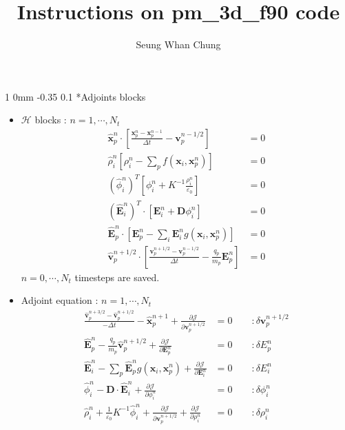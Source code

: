 \documentclass[11pt]{article}
\title{Instructions on pm\_3d\_f90 code}
\author{Seung Whan Chung}
\makeatletter
\renewcommand{\subsection}{\@startsection
{subsection}%
{1}%
{0mm}%
{-0.35\baselineskip}%
{0.1\baselineskip}%
{\normalfont\large\bfseries\color{brown}}}%
\def\Dpartial#1#2{ \frac{\partial #1}{\partial #2} }
\newcommand{\vp}{\mathbf{v}_p}
\newcommand{\xp}{\mathbf{x}_p}
\newcommand{\Dt}{\Delta t}
\newcommand{\vph}{\hat{\mathbf{v}}_p}
\newcommand{\xph}{\hat{\mathbf{x}}_p}
\newcommand{\Eh}{\hat{\mathbf{E}}}
\newcommand{\phih}{\hat{\phi}}
\newcommand{\rhoh}{\hat{\rho}}
\newcommand{\cH}{\mathcal{H}}
\newcommand{\cJ}{\mathcal{J}}
\makeatother
\begin{document}
\maketitle
\tableofcontents
\clearpage

\subsection*{Adjoints blocks}

\begin{itemize}
\item $\cH$ blocks : $n=1,\cdots,N_t$
\begin{equation*}
\begin{split}
\xph^{n}\cdot\left[ \frac{\xp^{n} - \xp^{n-1}}{\Dt} - \vp^{n-1/2} \right] &= 0\\
\rhoh_{i}^n\left[ \rho_{i}^n - \sum\limits_p f\left( \mathbf{x}_{i}, \xp^n \right) \right] &= 0\\
\left( \phih_i^{n} \right)^T\left[ \phi_i^n + K^{-1}\frac{\rho_i^n}{\varepsilon_0} \right] &= 0\\
\left( \Eh_i^n \right)^T\cdot\left[ \mathbf{E}_i^n + \mathbf{D}\phi_i^n \right] &= 0\\
\Eh_{p}^{n}\cdot\left[ \mathbf{E}_{p}^{n} - \sum\limits_{i}\mathbf{E}_{i}^{n} g\left( \mathbf{x}_{i}, \xp^{n} \right) \right] &= 0\\
\vph^{n+1/2}\cdot\left[ \frac{\vp^{n+1/2} - \vp^{n-1/2}}{\Dt} - \frac{q_p}{m_p}\mathbf{E}_p^{n} \right] &= 0
\end{split}
\end{equation*}
$n=0,\cdots,N_t$ timesteps are saved.
\item Adjoint equation : $n=1,\cdots,N_t$
\begin{equation*}
\begin{split}
\frac{\vph^{n+3/2} - \vph^{n+1/2}}{-\Dt} - \xph^{n+1} + \Dpartial{\cJ}{\vp^{n+1/2}} &= 0\qquad:\delta \vp^{n+1/2}\\
\Eh_{p}^{n} - \frac{q_p}{m_p}\vph^{n+1/2} + \Dpartial{\cJ}{\mathbf{E}_p^{n}} &= 0\qquad:\delta E_p^{n}\\
\Eh_{i}^{n} - \sum\limits_p \Eh_{p}^{n}g\left( \mathbf{x}_{i}, \xp^{n} \right) + \Dpartial{\cJ}{\mathbf{E}_i^{n}} &= 0\qquad:\delta E_i^{n}\\
\phih_i^{n} - \mathbf{D}\cdot\Eh_i^{n} + \Dpartial{\cJ}{\phi_i^{n}} &= 0\qquad:\delta \phi_i^{n}\\
\rhoh_i^{n} + \frac{1}{\varepsilon_0}K^{-1}\phih_i^{n} + \Dpartial{\cJ}{\vp^{n+1/2}} + \Dpartial{\cJ}{\rho_i^{n}} &= 0\qquad:\delta \rho_i^{n}\\

\end{split}
\end{equation*}
\end{itemize}
\end{document}
